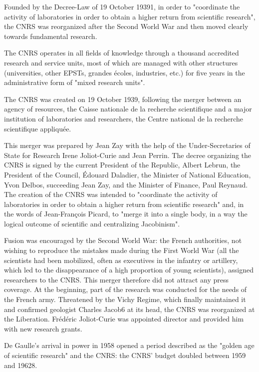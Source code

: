 Founded by the Decree-Law of 19 October 19391, in order to "coordinate the activity of laboratories in order to obtain a higher return from scientific research", the CNRS was reorganized after the Second World War and then moved clearly towards fundamental research.

The CNRS operates in all fields of knowledge through a thousand accredited research and service units, most of which are managed with other structures (universities, other EPSTs, grandes écoles, industries, etc.) for five years in the administrative form of "mixed research units".


The CNRS was created on 19 October 1939, following the merger between an agency of resources, the Caisse nationale de la recherche scientifique and a major institution of laboratories and researchers, the Centre national de la recherche scientifique appliquée.

This merger was prepared by Jean Zay with the help of the Under-Secretaries of State for Research Irene Joliot-Curie and Jean Perrin. The decree organizing the CNRS is signed by the current President of the Republic, Albert Lebrun, the President of the Council, Édouard Daladier, the Minister of National Education, Yvon Delbos, succeeding Jean Zay, and the Minister of Finance, Paul Reynaud. The creation of the CNRS was intended to "coordinate the activity of laboratories in order to obtain a higher return from scientific research" and, in the words of Jean-François Picard, to "merge it into a single body, in a way the logical outcome of scientific and centralizing Jacobinism".

Fusion was encouraged by the Second World War: the French authorities, not wishing to reproduce the mistakes made during the First World War (all the scientists had been mobilized, often as executives in the infantry or artillery, which led to the disappearance of a high proportion of young scientists), assigned researchers to the CNRS. This merger therefore did not attract any press coverage. At the beginning, part of the research was conducted for the needs of the French army. Threatened by the Vichy Regime, which finally maintained it and confirmed geologist Charles Jacob6 at its head, the CNRS was reorganized at the Liberation. Frédéric Joliot-Curie was appointed director and provided him with new research grants.

De Gaulle's arrival in power in 1958 opened a period described as the "golden age of scientific research" and the CNRS: the CNRS' budget doubled between 1959 and 19628.

